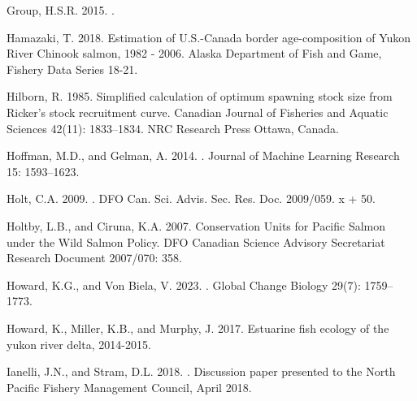 \documentclass[11pt]{book}
\begin{document}
\begin{CSLReferences}{1}{0}
%
Group, H.S.R. 2015. .

%
Hamazaki, T. 2018. {Estimation of U.S.-Canada border age-composition of {Y}ukon {R}iver {C}hinook salmon, 1982 - 2006}. Alaska Department of Fish and Game, Fishery Data Series 18-21.

%
Hilborn, R. 1985. Simplified calculation of optimum spawning stock size from {R}icker's stock recruitment curve. Canadian Journal of Fisheries and Aquatic Sciences 42(11): 1833--1834. NRC Research Press Ottawa, Canada.

%
Hoffman, M.D., and Gelman, A. 2014. . Journal of Machine Learning Research 15: 1593--1623.

%
Holt, C.A. 2009. . DFO Can. Sci. Advis. Sec. Res. Doc. 2009/059. x + 50.

%
Holtby, L.B., and Ciruna, K.A. 2007. Conservation {Units} for {Pacific Salmon} under the {Wild Salmon Policy}. DFO Canadian Science Advisory Secretariat Research Document 2007/070: 358.

%
Howard, K.G., and Von Biela, V. 2023. . Global Change Biology 29(7): 1759--1773.

%
Howard, K., Miller, K.B., and Murphy, J. 2017. Estuarine fish ecology of the yukon river delta, 2014-2015.

%
Ianelli, J.N., and Stram, D.L. 2018. . Discussion paper presented to the North Pacific Fishery Management Council, April 2018.


\end{CSLReferences}
\end{document}
